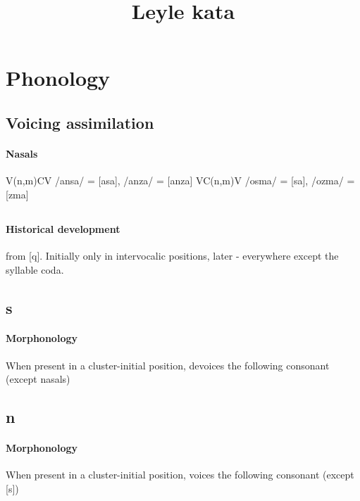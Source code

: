 \documentclass[11pt]{article}
\title{Leyle kata}
\begin{document}
\newcommand{\auxthreesg}{the }
\maketitle


\section{Phonology}

\subsection{Voicing assimilation}

\paragraph{Nasals}

\begin{exe}
\ex V(n,m)CV \textrightarrow /ansa/ = [asa], /anza/ = [anza]
\ex VC(n,m)V \textrightarrow /osma/ = [\textopeno sa], /ozma/ = [\textopeno zma] 
\end{exe}

\subsection{}
\paragraph{Historical development} from [q]. Initially only in intervocalic positions, later - everywhere except the syllable coda.

\subsection{s}
\paragraph{Morphonology} When present in a cluster-initial position, devoices the following consonant (except nasals)

\subsection{n}
\paragraph{Morphonology} When present in a cluster-initial position, voices the following consonant (except [s])
\end{document}
